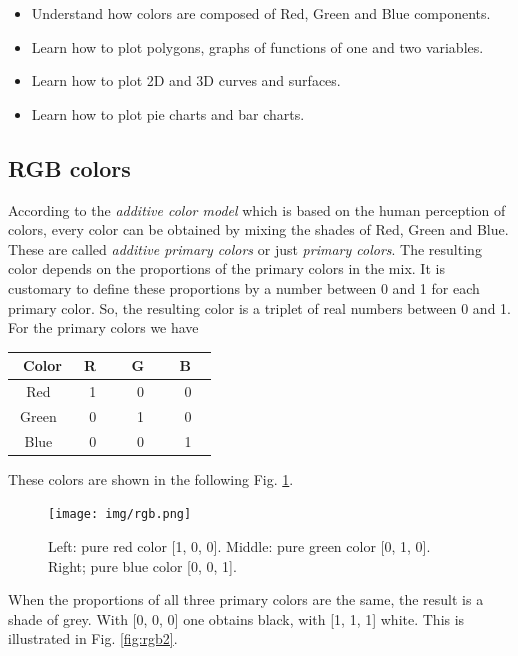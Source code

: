 \documentclass[article,A4,12pt]{llncs}
\begin{document}
\begin{itemize}
\item Understand how colors are composed of Red, Green and Blue components.
\item Learn how to plot polygons, graphs of functions of one and two variables.
\item Learn how to plot 2D and 3D curves and surfaces.
\item Learn how to plot pie charts and bar charts.
\end{itemize}


\subsection{RGB colors}

According to the {\em additive color model} which is based on the human perception of colors,
every color can be obtained by mixing the shades of Red, Green and Blue. These are 
called {\em additive primary colors} or just {\em primary colors}. The resulting color depends on the proportions of the 
primary colors in the mix. It is customary to define these proportions by a number 
between 0 and 1 for each primary color. So, the resulting color is a triplet of 
real numbers between 0 and 1. For the primary colors we have\\

\begin{center}
\begin{tabular}{|c||c|c|c|}
\hline
\ Color & \ R \ & \ G \ & \ B \ \\
\hline
\hline
Red & 1 & 0 & 0\\
\hline
Green & 0 & 1 & 0\\
\hline
Blue & 0 & 0 & 1\\
\hline
\end{tabular}
\end{center}
\vspace{4mm}
These colors are shown in the following Fig. \ref{fig:rgb}.

\begin{figure}[!ht]
\begin{center}
\texttt{[image: img/rgb.png]}
\end{center}
\vspace{-2mm}
\caption{Left: pure red color [1, 0, 0]. Middle: pure green color [0, 1, 0]. Right; pure blue color [0, 0, 1].}
\label{fig:rgb}
\end{figure}
\noindent
When the proportions of all three primary colors are the same, the result is a shade of grey.
With [0, 0, 0] one obtains black, with [1, 1, 1] white. This is illustrated in Fig. \ref{fig:rgb2}.
\end{document}
